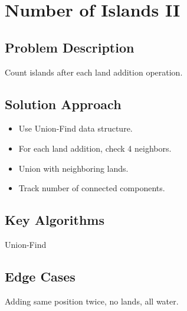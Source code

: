 \documentclass[10pt, a4paper]{article}
\begin{document}
\section{Number of Islands II}
\subsection*{Problem Description}
Count islands after each land addition operation.

\subsection*{Solution Approach}
\begin{itemize}
    \item Use Union-Find data structure.
    \item For each land addition, check 4 neighbors.
    \item Union with neighboring lands.
    \item Track number of connected components.
\end{itemize}

\subsection*{Key Algorithms}
Union-Find

\subsection*{Edge Cases}
Adding same position twice, no lands, all water.
\end{document}
